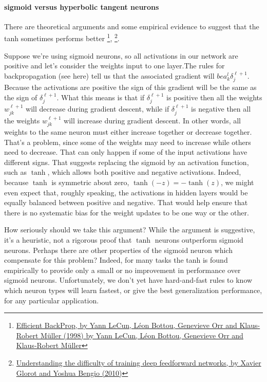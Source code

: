 \documentclass[12pt, letterpaper]{article}
\theoremstyle{definition}
\let\tb\textbf
\begin{document}
 \paragraph{\tb{sigmoid versus hyperbolic tangent neurons}} There are theoretical arguments and some empirical evidence to suggest that the tanh sometimes performs better \footnote{\href{http://yann.lecun.com/exdb/publis/pdf/lecun-98b.pdf}{Efficient BackProp, by Yann LeCun, Léon Bottou, Genevieve Orr and Klaus-Robert Müller (1998) by Yann LeCun, Léon Bottou, Genevieve Orr and Klaus-Robert Müller}}, \footnote{\href{http://proceedings.mlr.press/v9/glorot10a/glorot10a.pdf}{Understanding the difficulty of training deep feedforward networks, by Xavier Glorot and Yoshua Bengio (2010)}}.
 
 Suppose we're using sigmoid neurons, so all activations in our network are positive and let's consider the weights input to one layer.The rules for backpropagation (see here) tell us that the associated gradient will $be a_k^l \delta^{\ell+1}_j$. Because the activations are positive the sign of this gradient will be the same as the sign of $\delta^{\ell+1}_j$. What this means is that if $\delta^{\ell+1}_j$ is positive then all the weights $w^{\ell+1}_{jk}$ will decrease during gradient descent, while if $\delta^{\ell+1}_j$ is negative then all the weights $w^{\ell+1}_{jk}$ will increase during gradient descent. In other words, all weights to the same neuron must either increase together or decrease together. That's a problem, since some of the weights may need to increase while others need to decrease. That can only happen if some of the input activations have different signs. That suggests replacing the sigmoid by an activation function, such as $\tanh$, which allows both positive and negative activations. Indeed, because $\tanh$ is symmetric about zero, $\tanh(-z)=-\tanh(z)$, we might even expect that, roughly speaking, the activations in hidden layers would be equally balanced between positive and negative. That would help ensure that there is no systematic bias for the weight updates to be one way or the other.

How seriously should we take this argument? While the argument is suggestive, it's a heuristic, not a rigorous proof that $\tanh$ neurons outperform sigmoid neurons. Perhaps there are other properties of the sigmoid neuron which compensate for this problem? Indeed, for many tasks the tanh is found empirically to provide only a small or no improvement in performance over sigmoid neurons. Unfortunately, we don't yet have hard-and-fast rules to know which neuron types will learn fastest, or give the best generalization performance, for any particular application.
\end{document}
